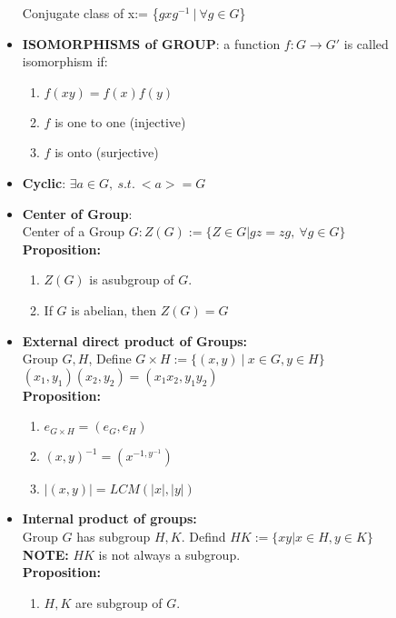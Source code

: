 \documentclass[12pt]{article}
\begin{document}
\begin{itemize}
        Conjugate class of x:= \{$gxg^{-1} \ | \ \forall g \in G$\}
        \item \textbf{ISOMORPHISMS of GROUP}: a function $f : G \rightarrow G'$ is called isomorphism if:
        \begin{enumerate}
            \item $f(xy) = f(x)f(y)$
            \item $f$ is one to one (injective)
            \item $f$ is onto (surjective)
        \end{enumerate}
        \item \textbf{Cyclic}: $\exists a \in G, \ s.t. \ <a> = G$
        \item \textbf{Center of Group}:\\
        Center of a Group $G: Z(G):= \{Z\in G | gz = zg, \ \forall g \in G\}$\\
        \textbf{Proposition:}
        \begin{enumerate}
            \item $Z(G)$ is asubgroup of $G$.
            \item If $G$ is abelian, then $Z(G) = G$
        \end{enumerate}
        \item \textbf{External direct product of Groups:}\\
        Group $G, H$, Define $G \times H :=\{(x,y) \ | \ x\in G, y \in H\}$\\
        $(x_1,y_1)(x_2, y_2) = (x_1x_2, y_1y_2)$\\
        \textbf{Proposition:}
        \begin{enumerate}
            \item $e_{G\times H} = (e_G, e_H)$
            \item $(x,y)^{-1} = (x^{-1, y^{-1}})$
            \item $|(x,y)| = LCM(|x|, |y|)$
        \end{enumerate}
        \item \textbf{Internal product of groups:}\\
        Group $G$ has subgroup $H, K$. Defind $HK:=\{xy | x\in H, y \in K\}$\\
        \textbf{NOTE:} $HK$ is not always a subgroup.\\
        \textbf{Proposition:}
        \begin{enumerate}
            \item $H,K$ are subgroup of $G$. \\

\end{enumerate}
\end{itemize}
\end{document}

